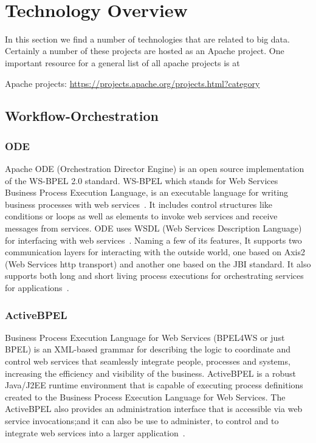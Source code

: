\FILENAME\

\chapter{Technology Overview}
\label{S:BD-tech}


In this section we find a number of technologies that are related to
big data. Certainly a number of these projects are hosted as an Apache
project. One important resource for a general list of all apache
projects is at


Apache projects: \url{https://projects.apache.org/projects.html?category}


\section{Workflow-Orchestration}
\label{S:o-workflow}

\subsection{ODE}

Apache ODE (Orchestration Director Engine) is an open source
implementation of the WS-BPEL 2.0 standard. WS-BPEL which stands for
Web Services Business Process Execution Language, is an executable
language for writing business processes with web
services~\cite{www-bpel-wiki}.  It includes control structures like
conditions or loops as well as elements to invoke web services and
receive messages from services.  ODE uses WSDL (Web Services
Description Language) for interfacing with web
services~\cite{www-ode-wiki}. Naming a few of its features, It
supports two communication layers for interacting with the outside
world, one based on Axis2 (Web Services http transport) and another
one based on the JBI standard. It also supports both long and short
living process executions for orchestrating services for
applications~\cite{www-ode-web}.

\subsection{ActiveBPEL}

Business Process Execution Language for Web Services (BPEL4WS or just
BPEL) is an XML-based grammar for describing the logic to coordinate
and control web services that seamlessly integrate people, processes
and systems, increasing the efficiency and visibility of the
business. ActiveBPEL is a robust Java/J2EE runtime environment that is
capable of executing process definitions created to the Business
Process Execution Language for Web Services. The ActiveBPEL also
provides an administration interface that is accessible via web
service invocations;and it can also be use to administer, to control
and to integrate web services into a larger
application~\cite{www-bpel}.


